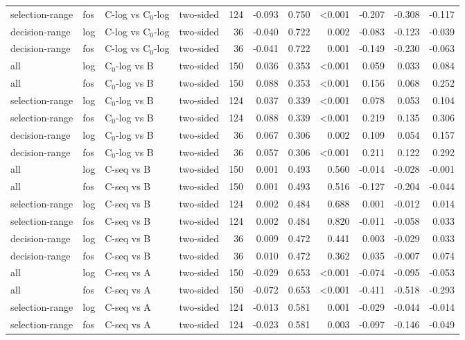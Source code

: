\begin{longtable}{llllrrrrrrr}
selection-range & fos & C-log vs C$_0$-log & two-sided & 124 & -0.093 & 0.750 & <0.001 & -0.207 & -0.308 & -0.117 \\
decision-range & log & C-log vs C$_0$-log & two-sided & 36 & -0.040 & 0.722 & 0.002 & -0.083 & -0.123 & -0.039 \\
decision-range & fos & C-log vs C$_0$-log & two-sided & 36 & -0.041 & 0.722 & 0.001 & -0.149 & -0.230 & -0.063 \\
all & log & C$_0$-log vs B & two-sided & 150 & 0.036 & 0.353 & <0.001 & 0.059 & 0.033 & 0.084 \\
all & fos & C$_0$-log vs B & two-sided & 150 & 0.088 & 0.353 & <0.001 & 0.156 & 0.068 & 0.252 \\
selection-range & log & C$_0$-log vs B & two-sided & 124 & 0.037 & 0.339 & <0.001 & 0.078 & 0.053 & 0.104 \\
selection-range & fos & C$_0$-log vs B & two-sided & 124 & 0.088 & 0.339 & <0.001 & 0.219 & 0.135 & 0.306 \\
decision-range & log & C$_0$-log vs B & two-sided & 36 & 0.067 & 0.306 & 0.002 & 0.109 & 0.054 & 0.157 \\
decision-range & fos & C$_0$-log vs B & two-sided & 36 & 0.057 & 0.306 & <0.001 & 0.211 & 0.122 & 0.292 \\
all & log & C-seq vs B & two-sided & 150 & 0.001 & 0.493 & 0.560 & -0.014 & -0.028 & -0.001 \\
all & fos & C-seq vs B & two-sided & 150 & 0.001 & 0.493 & 0.516 & -0.127 & -0.204 & -0.044 \\
selection-range & log & C-seq vs B & two-sided & 124 & 0.002 & 0.484 & 0.688 & 0.001 & -0.012 & 0.014 \\
selection-range & fos & C-seq vs B & two-sided & 124 & 0.002 & 0.484 & 0.820 & -0.011 & -0.058 & 0.033 \\
decision-range & log & C-seq vs B & two-sided & 36 & 0.009 & 0.472 & 0.441 & 0.003 & -0.029 & 0.033 \\
decision-range & fos & C-seq vs B & two-sided & 36 & 0.010 & 0.472 & 0.362 & 0.035 & -0.007 & 0.074 \\
all & log & C-seq vs A & two-sided & 150 & -0.029 & 0.653 & <0.001 & -0.074 & -0.095 & -0.053 \\
all & fos & C-seq vs A & two-sided & 150 & -0.072 & 0.653 & <0.001 & -0.411 & -0.518 & -0.293 \\
selection-range & log & C-seq vs A & two-sided & 124 & -0.013 & 0.581 & 0.001 & -0.029 & -0.044 & -0.014 \\
selection-range & fos & C-seq vs A & two-sided & 124 & -0.023 & 0.581 & 0.003 & -0.097 & -0.146 & -0.049 \\

\end{longtable}
